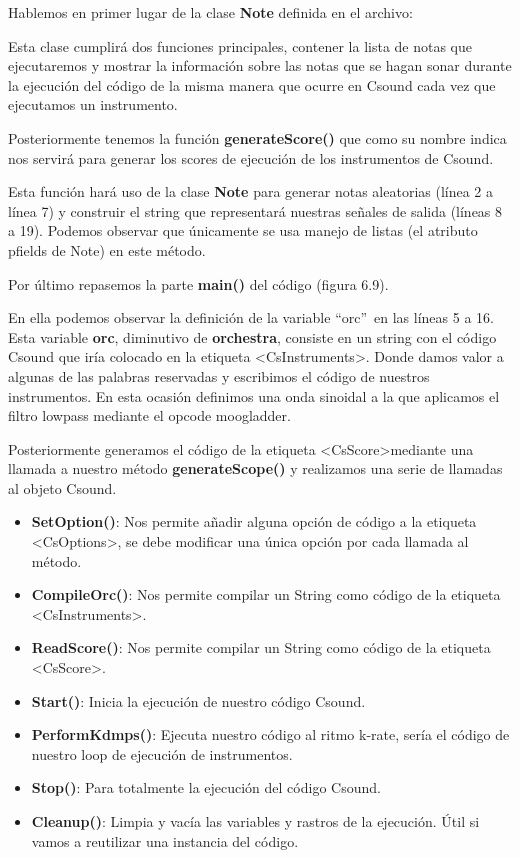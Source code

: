 Hablemos en primer lugar de la clase \textbf{Note} definida en el archivo:


Esta clase cumplirá dos funciones principales, contener la lista de notas que ejecutaremos y mostrar la información sobre las notas que se hagan sonar durante la ejecución del código de la misma manera que ocurre en Csound cada vez que ejecutamos un instrumento.
\bigskip

Posteriormente tenemos la función \textbf{generateScore()} que como su nombre indica nos servirá para generar los scores de ejecución de los instrumentos de Csound.


Esta función hará uso de la clase \textbf{Note} para generar notas aleatorias (línea 2 a línea 7) y construir el string que representará nuestras señales de salida (líneas 8 a 19). Podemos observar que únicamente se usa manejo de listas (el atributo pfields de Note) en este método.
\bigskip

Por último repasemos la parte \textbf{main()} del código (figura 6.9).

En ella podemos observar la definición de la variable ``orc''\ en las líneas 5 a 16. Esta variable \textbf{orc}, diminutivo de \textbf{orchestra}, consiste en un string con el código Csound que iría colocado en la etiqueta \textless CsInstruments\textgreater. Donde damos valor a algunas de las palabras reservadas y escribimos el código de nuestros instrumentos. En esta ocasión definimos una onda sinoidal a la que aplicamos el filtro lowpass mediante el opcode moogladder.

Posteriormente generamos el código de la etiqueta \textless CsScore\textgreater mediante una llamada a nuestro método \textbf{generateScope()} y realizamos una serie de llamadas al objeto Csound. 

\begin{itemize}
 \item \textbf{SetOption()}: Nos permite añadir alguna opción de código a la etiqueta \textless CsOptions\textgreater, se debe modificar una única opción por cada llamada al método.
 \item \textbf{CompileOrc()}: Nos permite compilar un String como código de la etiqueta \textless CsInstruments\textgreater.
 \item \textbf{ReadScore()}: Nos permite compilar un String como código de la etiqueta \textless CsScore\textgreater.
 \item \textbf{Start()}: Inicia la ejecución de nuestro código Csound.
 \item \textbf{PerformKdmps()}: Ejecuta nuestro código al ritmo k-rate, sería el código de nuestro loop de ejecución de instrumentos.
 \item \textbf{Stop()}: Para totalmente la ejecución del código Csound.
 \item \textbf{Cleanup()}: Limpia y vacía las variables y rastros de la ejecución. Útil si vamos a reutilizar una instancia del código.
\end{itemize}


